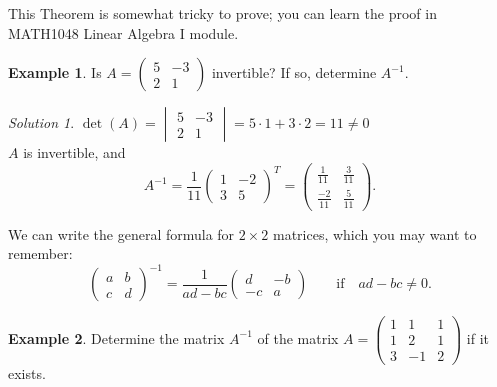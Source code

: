 \documentclass[
  12pt,
  oneside]{book}
\theoremstyle{definition}
\theoremstyle{definition}
\newtheorem{example}{Example}[chapter]
\theoremstyle{definition}
\theoremstyle{definition}
\theoremstyle{remark}
\newtheorem*{solution}{Solution}
\begin{document}
This Theorem is somewhat tricky to prove; you can learn the proof in MATH1048 Linear Algebra I module.

\begin{example}
Is \(A=\begin{pmatrix}5&-3\\2&1\end{pmatrix}\) invertible? If so, determine \(A^{-1}\).
\end{example}

\begin{solution}
\(\det(A)=\begin{vmatrix}5&-3\\2&1\end{vmatrix}=5\cdot1+3\cdot2=11\neq0\)\\
\(A\) is invertible, and
\[
A^{-1} = \frac{1}{11}\begin{pmatrix}1&-2\\3&5\end{pmatrix}^T
= \begin{pmatrix}\frac{1}{11}&\frac{3}{11}\\\frac{-2}{11}&\frac{5}{11}\end{pmatrix}.
\]
\end{solution}

We can write the general formula for \(2\times 2\) matrices, which you may want to remember:
\[
\begin{pmatrix}a&b\\c&d\end{pmatrix}^{-1} = \frac{1}{ad-bc} \begin{pmatrix}d&-b\\-c&a\end{pmatrix}\quad\quad
\text{if}\quad ad-bc\neq0.
\]

\begin{example}
Determine the matrix \(A^{-1}\) of the matrix \(A=\begin{pmatrix}1&1&1\\1&2&1\\3&-1&2\end{pmatrix}\) if it exists.
\end{example}
\end{document}
